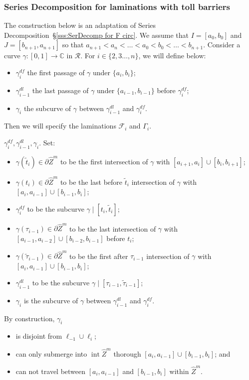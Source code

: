 \documentclass{amsart}
\newcommand{\1}{{\mathbb 1 }}
\newcommand{\Fam}{{\mathcal F}}
\newcommand\RR{\mathcal{R}}
\newcommand\intr{\operatorname{int}}
\newcommand{\wZ}{{\widehat Z}}
\newcommand{\C}{\mathbb{C}}
\theoremstyle{remark}
\numberwithin{equation}{section}
\theoremstyle{definition}
\begin{document}
\subsubsection{Series Decomposition for laminations with toll barriers} \label{sss:SetDecomp:TallBarr}The construction  below is an adaptation of Series Decomposition~\S\ref{sss:SerDecomp for F circ}.  We assume that $I=[a_0,b_0]$ and $J=[b_{n+1},a_{n+1}]$ so that $a_{n+1}<a_n<\dots <a_0<b_0<\dots <b_{n+1}$. Consider a curve $\gamma\colon[0,1]\to \C$ in $ \RR$. For $i\in \{2,3\dots, n\}$, we will define below:
\begin{itemize}
\item $\gamma_i^{df}$ the first passage of $\gamma$ under $\{a_i, b_i\}$;
\item $\gamma_{i-1}^{dl}$ the last passage of $\gamma$ under $\{a_{i-1}, b_{i-1}\}$ before $\gamma_i^{df}$;
\item $\gamma_i$ the subcurve of $\gamma$ between $\gamma_{i-1}^{dl}$ and $\gamma_i^{df}$.
\end{itemize}
Then we will specify the laminations $\Fam_i$ and $\Gamma_{i}$.



 $\gamma_i^{df},\gamma_{i-1}^{dl}, \gamma_i$. Set:
\begin{itemize}
\item $\gamma(\tilde t_i)\in \partial \wZ^m$ to be the first intersection of $\gamma$ with 
$[a_{i+1}, a_{i}]\cup [b_{i},b_{i+1}]$;
\item $\gamma(t_i)\in \partial \wZ^m$ to be the last before $\tilde t_i$ intersection of $\gamma$ with $[a_i, a_{i-1}]\cup [b_{i-1},b_i]$;
\item $\gamma^{df}_i$ to be the subcurve $\gamma\mid [t_i,\tilde t_i]$;
\item $\gamma( \tau_{i-1})\in \partial \wZ^m$ to be the last intersection of $\gamma$ with 
$[a_{i-1}, a_{i-2}]\cup [b_{i-2},b_{i-1}]$ before $t_i$;
\item $\gamma(\tilde \tau_{i-1})\in \partial \wZ^m$ to be the first after $\tau_{i-1}$ intersection of $\gamma$ with $[a_i, a_{i-1}]\cup [b_{i-1},b_i]$;
\item $\gamma^{dl}_{i-1}$ to be the subcurve $\gamma\mid [\tau_{i-1},\tilde \tau_{i-1}]$;
\item $\gamma_i$ is the subcurve of $\gamma$ between $\gamma_{i-1}^{dl}$ and $\gamma_i^{df}$.
\end{itemize} 


By construction, $\gamma_i$ 
\begin{itemize}
\item is disjoint from $\ell_{-1}\cup \ell_i$;
\item can only submerge into $\intr \wZ^m$ thorough $[a_i, a_{i-1}]\cup [b_{i-1},b_i]$; and
\item can not travel between $[a_i, a_{i-1}]$ and $ [b_{i-1},b_i]$ within $\wZ^m$.
\end{itemize}
\end{document}
